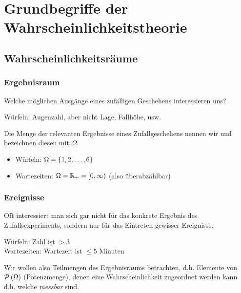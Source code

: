 \chapter{Grundbegriffe der Wahrscheinlichkeitstheorie}
\section{Wahrscheinlichkeitsräume}
\subsection*{Ergebnisraum}
Welche möglichen Ausgänge eines zufälligen Geschehens interessieren uns?
\begin{*beispiel}
    Würfeln: Augenzahl, aber nicht Lage, Fallhöhe, usw.
\end{*beispiel}

\begin{definition}[Ergebnisraum]
    Die Menge der relevanten Ergebnisse eines Zufallgeschehens nennen wir  und bezeichnen diesen mit $\Omega$.
\end{definition}

\begin{*beispiel}
    \begin{itemize}
        \item Würfeln: $\Omega = \left\{ 1,2, \dots , 6 \right\}$
        \item Wartezeiten: $\Omega = \mathbb{R}_+ = [0,\infty)$ (also überabzählbar)
    \end{itemize}
\end{*beispiel}

\subsection*{Ereignisse}
Oft interessiert man sich gar nicht für das konkrete Ergebnis des Zufallsexperiments, sondern nur für das Eintreten gewisser Ereignisse.

\begin{*beispiel}
    Würfeln: Zahl ist $> 3$ \\
    Wartezeiten: Wartezeit ist $\leq 5$ Minuten
\end{*beispiel}

Wir wollen also Teilmengen des Ergebnisraums betrachten, d.h. Elemente von $\mathcal{P}\left( \Omega \right)$ (Potenzmenge), denen eine Wahrscheinlichkeit zugeordnet werden kann d.h. welche \textit{messbar} sind.

